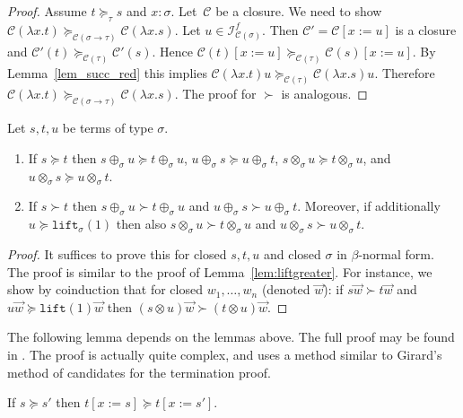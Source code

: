 \documentclass[a4paper,UKenglish,cleveref,autoref,numberwithinsect]{lipics-v2019}
\theoremstyle{definition}
\newcommand{\Iterms}{\mathcal{I}}
\newcommand{\arrtype}{\rightarrow}
\newcommand{\subst}[2]{#1:=#2}
\newcommand{\abs}[2]{\lambda #1.#2}
\newcommand{\lift}{\mathtt{lift}}
\newcommand{\cl}{\mathcal{C}}
\begin{document}
\begin{proof}
  Assume $t \succeq_\tau s$ and $x : \sigma$. Let~$\cl$
  be a closure. We need to show
  $\cl(\abs{x}{t}) \succeq_{\cl(\sigma\arrtype\tau)}
  \cl(\abs{x}{s})$. Let $u \in \Iterms^f_{\cl(\sigma)}$. Then
  $\cl' = \cl[\subst{x}{u}]$ is a closure and
  $\cl'(t) \succeq_{\cl(\tau)} \cl'(s)$. Hence
  $\cl(t)[\subst{x}{u}] \succeq_{\cl(\tau)} \cl(s)[\subst{x}{u}]$. By
  Lemma~\ref{lem_succ_red} this implies
  $\cl(\abs{x}{t}) u \succeq_{\cl(\tau)} \cl(\abs{x}{s}) u$. Therefore
  $\cl(\abs{x}{t}) \succeq_{\cl(\sigma\arrtype\tau)}
  \cl(\abs{x}{s})$. The proof for $\succ$ is analogous.
\end{proof}

\begin{lemma}\label{lem:plustimesmonotonic}
  Let $s,t,u$ be terms of type $\sigma$.
  \begin{enumerate}
  \item If $s \succeq t$ then $s \oplus_\sigma u \succeq t
    \oplus_\sigma u$, $u \oplus_\sigma s \succeq u \oplus_\sigma t$,
    $s \otimes_\sigma u \succeq t \otimes_\sigma u$, and $u
    \otimes_\sigma s \succeq u \otimes_\sigma t$.
  \item If $s \succ t$ then $s \oplus_\sigma u \succ t \oplus_\sigma
    u$ and $u \oplus_\sigma s \succ u \oplus_\sigma t$. Moreover, if
    additionally $u \succeq \lift_\sigma(1)$ then also $s
    \otimes_\sigma u \succ t \otimes_\sigma u$ and $u \otimes_\sigma s
    \succ u \otimes_\sigma t$.
  \end{enumerate}
\end{lemma}

\begin{proof}
  It suffices to prove this for closed $s,t,u$ and closed $\sigma$ in
  $\beta$-normal form. The proof is similar to the proof of
  Lemma~\ref{lem:liftgreater}. For instance, we show by coinduction
  that for closed $w_1,\ldots,w_n$ (denoted $\vec{w}$): if
  $s \vec{w} \succ t \vec{w}$ and $u \vec{w} \succeq \lift(1) \vec{w}$
  then $(s \otimes u) \vec{w} \succ (t \otimes u) \vec{w}$.
\end{proof}

The following lemma depends on the lemmas above. The full proof may be
found in \cite[Appendix~A.2]{versionwithappendix}. The proof is actually quite
complex, and uses a method similar to Girard's method of candidates
for the termination proof.

\begin{lemma}\label{lem_succeq_subst}
  If $s \succeq s'$ then $t[\subst{x}{s}] \succeq t[\subst{x}{s'}]$.
\end{lemma}
\end{document}
